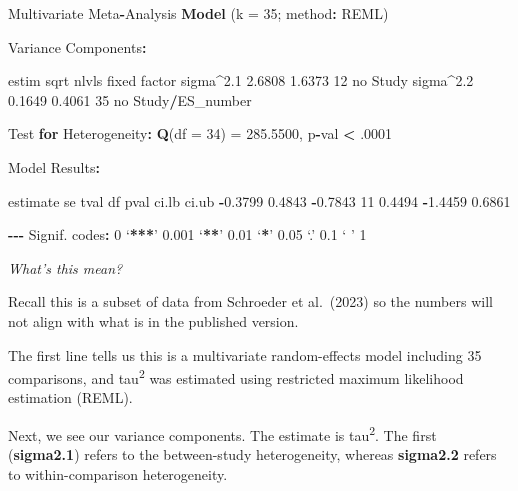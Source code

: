 \documentclass[
]{book}
\newenvironment{Shaded}{\begin{snugshade}}{\end{snugshade}}
\newcommand{\AttributeTok}[1]{\textcolor[rgb]{0.13,0.29,0.53}{#1}}
\newcommand{\ControlFlowTok}[1]{\textcolor[rgb]{0.13,0.29,0.53}{\textbf{#1}}}
\newcommand{\DecValTok}[1]{\textcolor[rgb]{0.00,0.00,0.81}{#1}}
\newcommand{\ErrorTok}[1]{\textcolor[rgb]{0.64,0.00,0.00}{\textbf{#1}}}
\newcommand{\FloatTok}[1]{\textcolor[rgb]{0.00,0.00,0.81}{#1}}
\newcommand{\FunctionTok}[1]{\textcolor[rgb]{0.13,0.29,0.53}{\textbf{#1}}}
\newcommand{\NormalTok}[1]{#1}
\newcommand{\OtherTok}[1]{\textcolor[rgb]{0.56,0.35,0.01}{#1}}
\newcommand{\SpecialCharTok}[1]{\textcolor[rgb]{0.81,0.36,0.00}{\textbf{#1}}}
\begin{document}
\begin{Shaded}
\begin{Highlighting}[]
\NormalTok{Multivariate Meta}\SpecialCharTok{{-}}\NormalTok{Analysis }\FunctionTok{Model}\NormalTok{ (}\AttributeTok{k =} \DecValTok{35}\NormalTok{; method}\SpecialCharTok{:}\NormalTok{ REML)}

\NormalTok{Variance Components}\SpecialCharTok{:}

\NormalTok{            estim    sqrt  nlvls  fixed           factor }
\NormalTok{sigma}\SpecialCharTok{\^{}}\FloatTok{2.1}  \FloatTok{2.6808}  \FloatTok{1.6373}     \DecValTok{12}\NormalTok{     no            Study }
\NormalTok{sigma}\SpecialCharTok{\^{}}\FloatTok{2.2}  \FloatTok{0.1649}  \FloatTok{0.4061}     \DecValTok{35}\NormalTok{     no  Study}\SpecialCharTok{/}\NormalTok{ES\_number }

\NormalTok{Test }\ControlFlowTok{for}\NormalTok{ Heterogeneity}\SpecialCharTok{:}
\FunctionTok{Q}\NormalTok{(}\AttributeTok{df =} \DecValTok{34}\NormalTok{) }\OtherTok{=} \FloatTok{285.5500}\NormalTok{, p}\SpecialCharTok{{-}}\NormalTok{val }\SpecialCharTok{\textless{}}\NormalTok{ .}\DecValTok{0001}

\NormalTok{Model Results}\SpecialCharTok{:}

\NormalTok{estimate      se     tval  df    pval    ci.lb   ci.ub    }
 \SpecialCharTok{{-}}\FloatTok{0.3799}  \FloatTok{0.4843}  \SpecialCharTok{{-}}\FloatTok{0.7843}  \DecValTok{11}  \FloatTok{0.4494}  \SpecialCharTok{{-}}\FloatTok{1.4459}  \FloatTok{0.6861}    

\SpecialCharTok{{-}{-}{-}}
\NormalTok{Signif. codes}\SpecialCharTok{:}  \DecValTok{0}\NormalTok{ ‘}\SpecialCharTok{**}\ErrorTok{*}\NormalTok{’ }\FloatTok{0.001}\NormalTok{ ‘}\SpecialCharTok{**}\NormalTok{’ }\FloatTok{0.01}\NormalTok{ ‘}\SpecialCharTok{*}\NormalTok{’ }\FloatTok{0.05}\NormalTok{ ‘.’ }\FloatTok{0.1}\NormalTok{ ‘ ’ }\DecValTok{1}
\end{Highlighting}
\end{Shaded}

\emph{What's this mean?}

Recall this is a subset of data from Schroeder et al.~(2023)\citep{schroeder2023} so the numbers will not align with what is in the published version.

The first line tells us this is a multivariate random-effects model including 35 comparisons, and tau\textsuperscript{2} was estimated using restricted maximum likelihood estimation (REML).

Next, we see our variance components. The estimate is tau\textsuperscript{2}. The first (\textbf{sigma2.1}) refers to the between-study heterogeneity, whereas \textbf{sigma2.2} refers to within-comparison heterogeneity.
\end{document}
